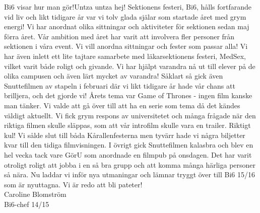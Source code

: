 \begin{news}{4}{Bi6 visar hur man gör!}{Untza untza hej!}{}{}
Sektionens festeri, Bi6, hålls fortfarande vid liv och likt tidigare år var 
vi tolv glada själar som startade året med grym energi! Vi har anordnat olika 
sittningar och aktiviteter för sektionen sedan maj förra året. Vår ambition med 
året har varit att involvera fler personer från sektionen i våra event. Vi vill 
anordna sittningar och fester som passar alla! Vi har även inlett ett lite 
tajtare samarbete med läkarsektionens festeri, MedSex, vilket varit både roligt 
och givande. Vi har hjälpt varandra nå ut till elever på de olika campusen och 
även lärt mycket av varandra! Såklart så gick även Snuttefilmen av stapeln i 
februari där vi likt tidigare år hade vår chans att brilljera, och det gjorde 
vi! Årets tema var Game of Thrones - ingen film kanske man tänker. Vi valde att 
gå över till att ha en serie som tema då det kändes väldigt aktuellt. Vi fick 
grym respons av universitetet och många frågade när den riktiga filmen skulle 
släppas, som att vår introfilm skulle vara en trailer. Riktigt kul! Vi sålde 
slut till båda Kårallenfesterna men tyvärr hade vi några biljetter kvar till 
den tidiga filmvisningen. I övrigt gick Snuttefilmen kalasbra och blev en hel 
vecka tack vare GörU som anordnade en filmpub på onsdagen. Det har varit 
otroligt roligt att jobba i en så bra grupp och att komma många härliga 
personer så nära. Nu laddar vi inför nya utmaningar och lämnar tryggt över till 
Bi6 15/16 som är nyuttagna. Vi är redo att bli pateter! 
\\
Caroline Blomström
\\
Bi6-chef 14/15
\end{news}